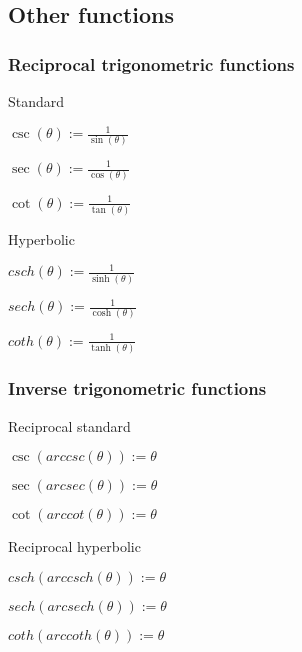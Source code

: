 
\subsection{Other functions}

\subsubsection{Reciprocal trigonometric functions}

Standard

\(\csc (\theta ):=\frac{1}{\sin (\theta )}\)

\(\sec (\theta ):=\frac{1}{\cos (\theta )}\)

\(\cot (\theta ):=\frac{1}{\tan (\theta )}\)

Hyperbolic

\(csch (\theta ):=\frac{1}{\sinh (\theta )}\)

\(sech (\theta ):=\frac{1}{\cosh (\theta )}\)

\(coth (\theta ):=\frac{1}{\tanh (\theta )}\)

\subsubsection{Inverse trigonometric functions}

Reciprocal standard

\(\csc (arccsc (\theta )):=\theta \)

\(\sec (arcsec (\theta )):=\theta \)

\(\cot (arccot (\theta )):=\theta \)

Reciprocal hyperbolic

\(csch (arccsch (\theta )):=\theta \)

\(sech (arcsech (\theta )):=\theta \)

\(coth (arccoth (\theta )):=\theta \)

